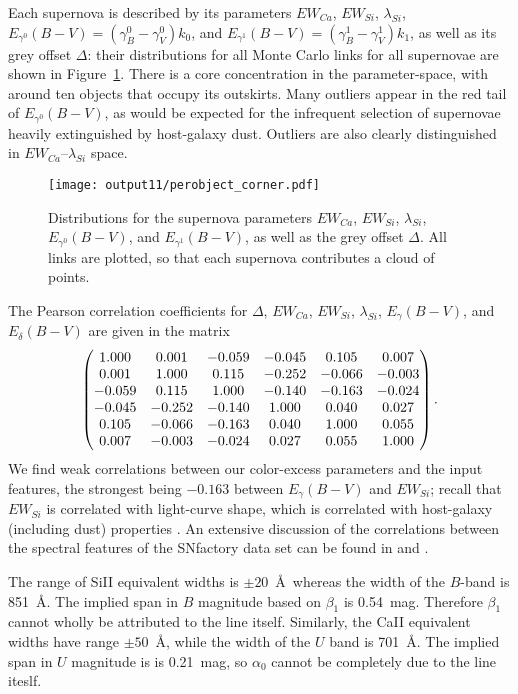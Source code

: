 \documentclass{aastex61}   	%
\begin{document}
Each supernova is described by its parameters $EW_{Ca}$, $EW_{Si}$, $\lambda_{Si}$, $E_{\gamma^0}(B-V)=(\gamma^0_B-\gamma^0_V)k_0$, and
$E_{\gamma^1}(B-V)=(\gamma^1_B-\gamma^1_V)k_1$, as well as its grey offset
$\Delta$: their distributions for all Monte Carlo links for all supernovae are shown in Figure~\ref{perobject:fig}.
There is a core concentration in the  parameter-space, with around ten objects that occupy its outskirts.
Many outliers appear in the red tail of $E_{\gamma^0}(B-V)$, as would be expected for the infrequent selection of supernovae
heavily extinguished by host-galaxy dust.
Outliers  are also clearly distinguished in  $EW_{Ca}$--$\lambda_{Si}$ space.

\begin{figure}[htbp] %
   \centering
   \texttt{[image: output11/perobject\_corner.pdf]} 
   \caption{Distributions for the supernova parameters $EW_{Ca}$, $EW_{Si}$, $\lambda_{Si}$, $E_{\gamma^0}(B-V)$, and $E_{\gamma^1}(B-V)$, as well as the grey offset
$\Delta$.  All links are plotted, so that each supernova contributes a cloud of points.
   \label{perobject:fig}}
\end{figure}

The Pearson correlation coefficients for $\Delta$, $EW_{Ca}$, $EW_{Si}$, $\lambda_{Si}$, $E_\gamma(B-V)$, and $E_\delta(B-V)$ are given in the matrix
\begin{equation}
\begin{pmatrix}
1.000 & 0.001 & -0.059 & -0.045 & 0.105 & 0.007 \cr
0.001 & 1.000 & 0.115 & -0.252 & -0.066 & -0.003 \cr
-0.059 & 0.115 & 1.000 & -0.140 & -0.163 & -0.024 \cr
-0.045 & -0.252 & -0.140 & 1.000 & 0.040 & 0.027 \cr
0.105 & -0.066 & -0.163 & 0.040 & 1.000 & 0.055 \cr
0.007 & -0.003 & -0.024 & 0.027 & 0.055 & 1.000
\end{pmatrix}.
\end{equation}
\color{red}
We find weak correlations between our color-excess parameters and the input features, the strongest being $-0.163$ between
$E_\gamma(B-V)$ and $EW_{Si}$;
\color{black}
recall that $EW_{Si}$ is correlated with light-curve shape, which is correlated with host-galaxy (including dust) properties 
\citep{2003MNRAS.340.1057S}.
An extensive discussion of the correlations between the spectral features of the SNfactory data set can be found in \citet{chotard:thesis}
and \citet{leget:thesis}.

The range of SiII equivalent widths is $\pm 20$~\AA\ whereas the width of the $B$-band is 851~\AA.  
The implied span in $B$ magnitude based on $\beta_1$ is 0.54~mag.  Therefore $\beta_1$ cannot wholly be attributed to the line itself.
Similarly, the CaII equivalent widths have range $\pm 50$~\AA, while the width of the $U$ band is
701~\AA.  The implied span in $U$ magnitude is is 0.21~mag, so $\alpha_0$ cannot be completely due to the line iteslf.
\end{document}
